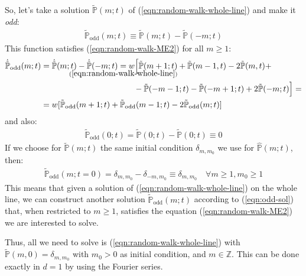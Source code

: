 \documentclass[../../main.tex]{subfiles}
\begin{document}
So, let's take a solution $\tilde{\mathbb{P}}(m;t)$ of (\ref{eqn:random-walk-whole-line}) and make it \textit{odd}:
\begin{align}\label{eqn:odd-sol}
    \tilde{\mathbb{P}}_{\mathrm{odd}}(m;t) \equiv \tilde{\mathbb{P}}(m;t) - \tilde{\mathbb{P}}(-m;t)
\end{align} 
This function satisfies (\ref{eqn:random-walk-ME2}) for all $m \geq 1$:
\begin{align*}
    \dot{\tilde{\mathbb{P}}}_{\mathrm{odd}}(m;t) &= \dot{\tilde{\mathbb{P}}}(m;t) - \dot{\tilde{\mathbb{P}}}(-m;t) \underset{\mathclap{(\ref{eqn:random-walk-whole-line})}}{=}  w \Big[ \tilde{\mathbb{P}}(m+1;t) + \tilde{\mathbb{P}}(m-1,t) - 2 \tilde{\mathbb{P}}(m,t) +\\
    &\hspace{11em}\>\> - \tilde{\mathbb{P}}(-m-1;t) - \tilde{\mathbb{P}}(-m+1;t) + 2\tilde{\mathbb{P}}(-m;t) \Big] =\\
    &= w[\tilde{\mathbb{P}}_{\mathrm{odd}}(m+1;t) + \tilde{\mathbb{P}}_{\mathrm{odd}}(m-1;t) - 2 \tilde{\mathbb{P}}_{\mathrm{odd}}(m;t)]
\end{align*}
and also:
\begin{align*}
    \tilde{\mathbb{P}}_{\mathrm{odd}}(0;t) = \tilde{\mathbb{P}}(0;t) - \tilde{\mathbb{P}}(0;t) \equiv 0
\end{align*}
If we choose for $\tilde{\mathbb{P}}(m;t)$ the same initial condition $\delta_{m,m_0}$ we use for $\hat{\mathbb{P}}(m;t)$, then:
\begin{align*}
    \tilde{\mathbb{P}}_{\mathrm{odd}}(m;t=0) = \delta_{m,m_0} - \delta_{-m,m_0} \equiv \delta_{m,m_0} \quad \forall m \geq 1, m_0 \geq 1
\end{align*}
This means that given a solution of (\ref{eqn:random-walk-whole-line}) on the whole line, we can construct another solution $\tilde{\mathbb{P}}_{\mathrm{odd}}(m;t)$ according to (\ref{eqn:odd-sol}) that, when restricted to $m \geq 1$, satisfies the equation (\ref{eqn:random-walk-ME2}) we are interested to solve.

\medskip

Thus, all we need to solve is (\ref{eqn:random-walk-whole-line}) with $\tilde{\mathbb{P}}(m,0) = \delta_{m,m_0}$ with $m_0 > 0$ as initial condition, and $m \in \mathbb{Z}$. This can be done exactly in $d=1$ by using the Fourier series.

\medskip
\end{document}
